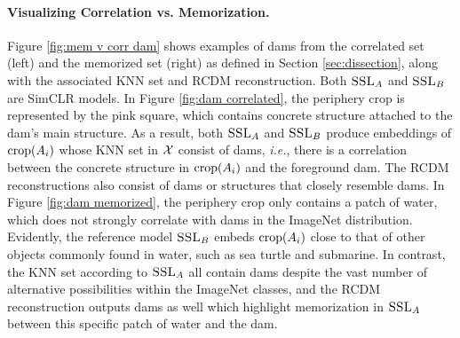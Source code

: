 \label{sec:mem v corr}
\vspace{-0.5em} 
\paragraph{Visualizing Correlation vs. Memorization.}
Figure \ref{fig:mem v corr dam} shows examples of dams from the correlated set (left) and the memorized set (right) as defined in Section \ref{sec:dissection}, along with the associated KNN set and RCDM reconstruction. Both $\textsc{SSL}_A$ and $\textsc{SSL}_B$ are SimCLR models. In Figure \ref{fig:dam correlated}, the periphery crop is represented by the pink square, which contains concrete structure attached to the dam's main structure. As a result, both $\textsc{SSL}_A$ and $\textsc{SSL}_B$ produce embeddings of $\mathrm{crop}({A_i})$ whose KNN set in $\mathcal{X}$ consist of dams, \emph{i.e.}, there is a correlation between the concrete structure in $\mathrm{crop}({A_i})$ and the foreground dam. The RCDM reconstructions also consist of dams or structures that closely resemble dams. 
In Figure \ref{fig:dam memorized}, the periphery crop only contains a patch of water, which does not strongly correlate with dams in the ImageNet distribution. Evidently, the reference model $\textsc{SSL}_B$ embeds $\mathrm{crop}({A_i})$ close to that of other objects commonly found in water, such as sea turtle and submarine. In contrast, the KNN set according to $\textsc{SSL}_A$ all contain dams despite the vast number of alternative possibilities within the ImageNet classes, and the RCDM reconstruction outputs dams as well which highlight memorization in $\textsc{SSL}_A$ between this specific patch of water and the dam. %


\vspace{-0.5em} 
